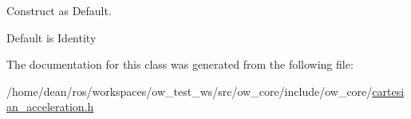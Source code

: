 Construct as Default. 

Default is Identity 

The documentation for this class was generated from the following file\+:\begin{DoxyCompactItemize}
\item 
/home/dean/ros/workspaces/ow\+\_\+test\+\_\+ws/src/ow\+\_\+core/include/ow\+\_\+core/\hyperlink{cartesian__acceleration_8h}{cartesian\+\_\+acceleration.\+h}\end{DoxyCompactItemize}
